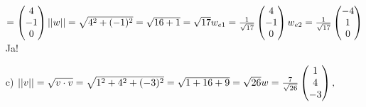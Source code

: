 \begin{enumerate}
\begin{math}
        =\begin{pmatrix}
            4\\
            -1\\
            0
        \end{pmatrix}
        \\
        ||w||
        =\sqrt{4^2+(-1)^2}
        =\sqrt{16+1}
        =\sqrt{17}
        \\
        w_{e1}
        =\frac{1}{\sqrt{17}}\begin{pmatrix}
            4\\
            -1\\
            0
        \end{pmatrix}
        \\
        w_{e2}
        =\frac{1}{\sqrt{17}}\begin{pmatrix}
            -4\\
            1\\
            0
        \end{pmatrix}
    \end{math}
    \hspace{6px}
    Ja!
    \item[c)]
        \begin{math}
            ||v||
            =\sqrt{v\cdot v}
            =\sqrt{1^2+4^2+(-3)^2}
            =\sqrt{1+16+9}
            =\sqrt{26}
            \\
            w
            =\frac{7}{\sqrt{26}}\begin{pmatrix}
                1\\
                4\\
                -3
            \end{pmatrix},
        \end{math}
\end{enumerate}